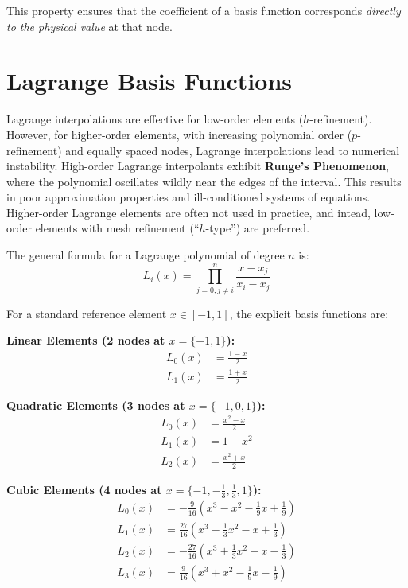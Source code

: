 \documentclass[12pt,report,justified]{SANDreport}
\begin{document}
This property ensures that the coefficient of a basis function corresponds {\em directly to the physical value} at that node.

\section{Lagrange Basis Functions}

Lagrange interpolations are effective for low-order elements ($h$-refinement).  However, for higher-order elements, with increasing polynomial order ($p$-refinement) and equally spaced nodes, Lagrange interpolations lead to numerical instability.  High-order Lagrange interpolants exhibit {\bf Runge’s Phenomenon}, where the polynomial oscillates wildly near the edges of the interval. This results in poor approximation properties and ill-conditioned systems of equations.
Higher-order Lagrange elements are often not used in practice, and intead, low-order elements with mesh refinement (``$h$-type'') are preferred.

The general formula for a Lagrange polynomial of degree $n$ is:
\begin{equation}
L_i(x) = \prod_{j=0, j \neq i }^n \frac{x - x_j}{x_i - x_j}
\end{equation}

For a standard reference element $x \in [-1, 1]$, the explicit basis functions are:

{\bf Linear Elements (2 nodes at $x = \{-1, 1\}$):}
\begin{align}
L_0(x) &= \frac{1 - x}{2} \\
L_1(x) &= \frac{1 + x}{2}
\end{align}

{\bf Quadratic Elements (3 nodes at $x = \{-1, 0, 1\}$):}
\begin{align}
L_0(x) &= \frac{x^2 - x}{2} \\
L_1(x) &= 1 - x^2 \\
L_2(x) &= \frac{x^2 + x}{2}
\end{align}

{\bf Cubic Elements (4 nodes at $x = \{-1, -\frac{1}{3}, \frac{1}{3}, 1\}$):}
\begin{align}
L_0(x) &= -\frac{9}{16} \left( x^3 - x^2 - \frac{1}{9}x + \frac{1}{9} \right) \\
L_1(x) &= \frac{27}{16} \left( x^3 - \frac{1}{3}x^2 - x + \frac{1}{3} \right) \\
L_2(x) &= -\frac{27}{16} \left( x^3 + \frac{1}{3}x^2 - x - \frac{1}{3} \right) \\
L_3(x) &= \frac{9}{16} \left( x^3 + x^2 - \frac{1}{9}x - \frac{1}{9} \right)
\end{align}
\end{document}
